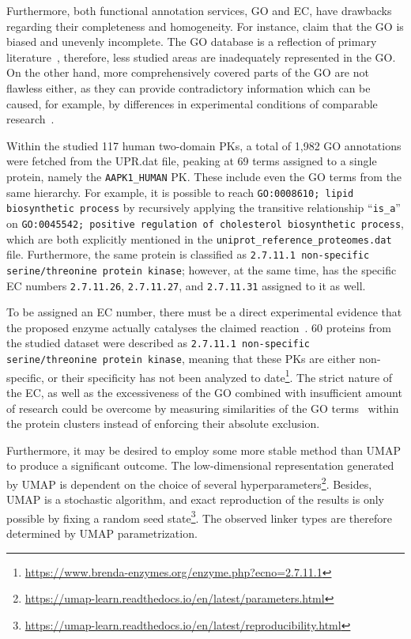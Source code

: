 Furthermore, both functional annotation services, GO and EC, have drawbacks regarding
their completeness and homogeneity.
For instance, \citet{gaudet2017gene} claim that the GO is biased and unevenly incomplete.
The GO database is a reflection of primary literature~\cite{gene2004gene}, therefore, less
studied areas are inadequately represented in the GO.
On the other hand, more comprehensively covered parts of the GO are not flawless either,
as they can provide contradictory information which can be caused, for example, by
differences in experimental conditions of comparable
research~\cite{hass2004response, mason2005multiple}.

Within the studied 117 human two-domain PKs, a total of 1,982 GO annotations were fetched
from the UPR.dat file, peaking at 69 terms assigned to a single protein, namely the
\texttt{AAPK1\_HUMAN} PK.
These include even the GO terms from the same hierarchy.
For example, it is possible to reach \texttt{GO:0008610; lipid biosynthetic process} by
recursively applying the transitive relationship ``\texttt{is\_a}'' on
\texttt{GO:0045542; positive regulation of cholesterol biosynthetic process}, which are
both explicitly mentioned in the \texttt{uniprot\_reference\_proteomes.dat} file.
Furthermore, the same protein is classified as \texttt{2.7.11.1 non-specific
serine/threonine protein kinase}; however, at the same time, has the specific EC numbers
\texttt{2.7.11.26}, \texttt{2.7.11.27}, and \texttt{2.7.11.31} assigned to it as well.

To be assigned an EC number, there must be a direct experimental evidence that the
proposed enzyme actually catalyses the claimed reaction~\cite{mcdonald2014fifty}.
60 proteins from the studied dataset were described as \texttt{2.7.11.1 non-specific
serine/threonine protein kinase}, meaning that these PKs are either non-specific,
or their specificity has not been analyzed to
date\footnote{\url{https://www.brenda-enzymes.org/enzyme.php?ecno=2.7.11.1}}.
The strict nature of the EC, as well as the excessiveness of the GO combined with
insufficient amount of research could be overcome by measuring similarities of the GO
terms~\cite{li2010effectively, zhao2018gogo} within the protein clusters instead of
enforcing their absolute exclusion.

Furthermore, it may be desired to employ some more stable method than UMAP to produce a
significant outcome.
The low-dimensional representation generated by UMAP is dependent on the
choice of several
hyperparameters\footnote{\url{https://umap-learn.readthedocs.io/en/latest/parameters.html}}.
Besides, UMAP is a stochastic algorithm, and exact reproduction of the results is only
possible by fixing a random seed
state\footnote{\url{https://umap-learn.readthedocs.io/en/latest/reproducibility.html}}.
The observed linker types are therefore determined by UMAP parametrization.

